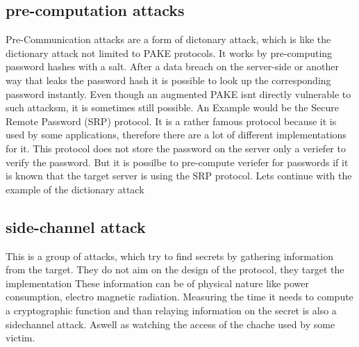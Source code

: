 \documentclass[journal]{IEEEtran}
\begin{document}
\subsection{pre-computation attacks}
Pre-Communication attacks are a form of dictonary attack, which is like the dictionary attack not limited to PAKE protocols. 
It works by pre-computing password hashes with a salt. After a data breach on the server-side or another way that leaks the password hash it is possible to look up the corresponding password instantly.
Even though an augmented PAKE isnt directly vulnerable to such attacksm, it is sometimes still possible.
An Example would be the Secure  Remote Password (SRP) protocol. It is a rather famous protocol because it is used by some applications, therefore there are a lot of different implementations for it. %
This protocol does not store the password on the server only a veriefer to verify the password. 
But it is possilbe to pre-compute veriefer for passwords if it is known that the target server is using the SRP protocol. 
Lets continue with the example of the dictionary attack %

\subsection{side-channel attack}
This is a group of attacks, which try to find secrets by gathering information from the target. They do not aim on the design of the protocol, they target the implementation 
These information can be of physical nature like power consumption, electro magnetic radiation. Measuring the time it needs to compute a cryptographic function and than relaying information on the secret is also a sidechannel attack.
Aswell as watching the access of the chache used by some victim. 
\end{document}
